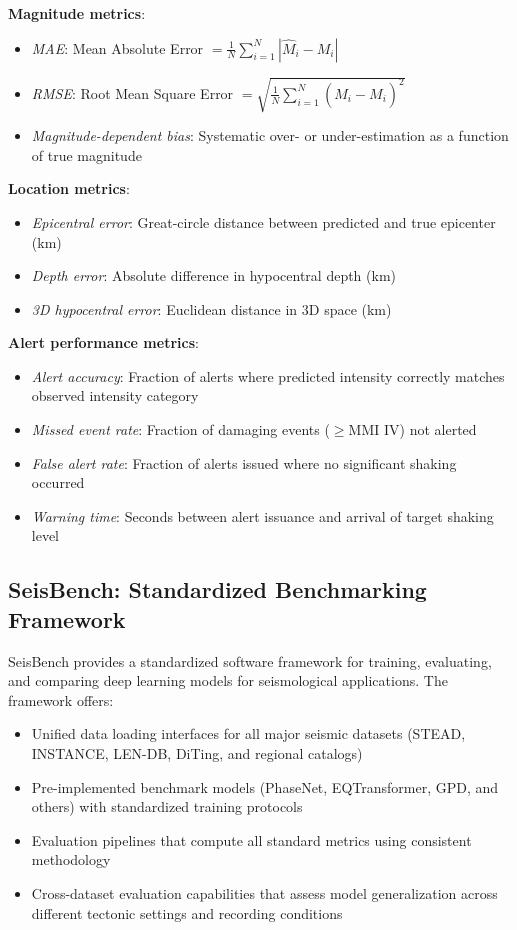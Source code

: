 \documentclass[review,authoryear]{elsarticle}
\begin{document}
\textbf{Magnitude metrics}:
\begin{itemize}
\item \textit{MAE}: Mean Absolute Error $= \frac{1}{N}\sum_{i=1}^{N}|\hat{M}_i - M_i|$
\item \textit{RMSE}: Root Mean Square Error $= \sqrt{\frac{1}{N}\sum_{i=1}^{N}(\hat{M}_i - M_i)^2}$
\item \textit{Magnitude-dependent bias}: Systematic over- or under-estimation as a function of true magnitude
\end{itemize}

\textbf{Location metrics}:
\begin{itemize}
\item \textit{Epicentral error}: Great-circle distance between predicted and true epicenter (km)
\item \textit{Depth error}: Absolute difference in hypocentral depth (km)
\item \textit{3D hypocentral error}: Euclidean distance in 3D space (km)
\end{itemize}

\textbf{Alert performance metrics}:
\begin{itemize}
\item \textit{Alert accuracy}: Fraction of alerts where predicted intensity correctly matches observed intensity category
\item \textit{Missed event rate}: Fraction of damaging events ($\geq$MMI IV) not alerted
\item \textit{False alert rate}: Fraction of alerts issued where no significant shaking occurred
\item \textit{Warning time}: Seconds between alert issuance and arrival of target shaking level
\end{itemize}

\subsection{SeisBench: Standardized Benchmarking Framework}

SeisBench \citep{woollam2022seisbench} provides a standardized software framework for training, evaluating, and comparing deep learning models for seismological applications. The framework offers:

\begin{itemize}
\item Unified data loading interfaces for all major seismic datasets (STEAD, INSTANCE, LEN-DB, DiTing, and regional catalogs)
\item Pre-implemented benchmark models (PhaseNet, EQTransformer, GPD, and others) with standardized training protocols
\item Evaluation pipelines that compute all standard metrics using consistent methodology
\item Cross-dataset evaluation capabilities that assess model generalization across different tectonic settings and recording conditions
\end{itemize}
\end{document}
